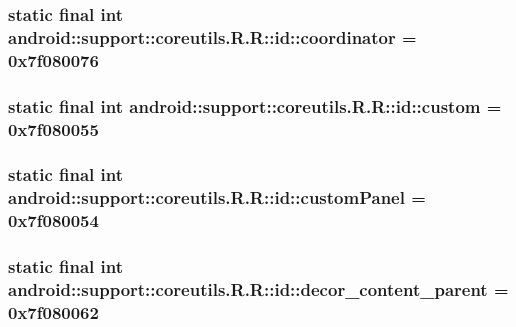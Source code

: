 \hypertarget{classandroid_1_1support_1_1coreutils_1_1_r_1_1id_a2d419609aff0001a4350914ea6e3d98}{
\subsubsection[{coordinator}]{\setlength{\rightskip}{0pt plus 5cm}static final int android::support::coreutils.R.R::id::coordinator = 0x7f080076}}
\label{classandroid_1_1support_1_1coreutils_1_1_r_1_1id_a2d419609aff0001a4350914ea6e3d98}


\hypertarget{classandroid_1_1support_1_1coreutils_1_1_r_1_1id_b941a27729b5027ed642ddf46713cb83}{
\subsubsection[{custom}]{\setlength{\rightskip}{0pt plus 5cm}static final int android::support::coreutils.R.R::id::custom = 0x7f080055}}
\label{classandroid_1_1support_1_1coreutils_1_1_r_1_1id_b941a27729b5027ed642ddf46713cb83}


\hypertarget{classandroid_1_1support_1_1coreutils_1_1_r_1_1id_21ed12f5dfe19b3c1362aa4ce2e9ada8}{
\subsubsection[{customPanel}]{\setlength{\rightskip}{0pt plus 5cm}static final int android::support::coreutils.R.R::id::customPanel = 0x7f080054}}
\label{classandroid_1_1support_1_1coreutils_1_1_r_1_1id_21ed12f5dfe19b3c1362aa4ce2e9ada8}


\hypertarget{classandroid_1_1support_1_1coreutils_1_1_r_1_1id_c4a059b008c80f1ef92f7331b20e3ab8}{
\subsubsection[{decor\_\-content\_\-parent}]{\setlength{\rightskip}{0pt plus 5cm}static final int android::support::coreutils.R.R::id::decor\_\-content\_\-parent = 0x7f080062}}
\label{classandroid_1_1support_1_1coreutils_1_1_r_1_1id_c4a059b008c80f1ef92f7331b20e3ab8}


